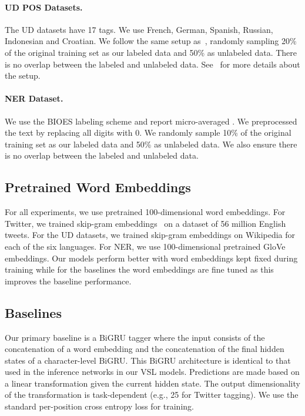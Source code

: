 \documentclass[11pt,a4paper]{article}
\newcommand{\klcomment}[1]{\textcolor{magenta}{\bf \small [ #1 --KL]}}
\renewcommand{\klcomment}[1]{}
\begin{document}
\paragraph{UD POS Datasets.} The UD datasets have 17 tags. We use French, German, Spanish, Russian, Indonesian and Croatian. We follow the same setup as~\citet{zhang2017semi}, randomly sampling 20\% of the original training set as our labeled data and 50\% as unlabeled data. There is no overlap between the labeled and unlabeled data. See~\citet{zhang2017semi} for more details about the setup.
\paragraph{NER Dataset.} We use the BIOES labeling scheme and report micro-averaged .
We preprocessed the text by replacing all digits with 0. We randomly sample 10\% of the original training set as our labeled data and 50\% as unlabeled data. We also ensure there is no overlap between the labeled and unlabeled data.

\subsection{Pretrained Word Embeddings}
For all experiments, we use pretrained 100-dimensional word embeddings. For Twitter, we trained skip-gram embeddings~\cite{mikolov2013efficient} on a dataset of 56 million English tweets.
For the UD datasets, we trained skip-gram embeddings on Wikipedia for each of the six languages. For NER, we use 100-dimensional pretrained GloVe~\cite{pennington2014glove} embeddings. Our models perform better with word embeddings kept fixed during training while for the baselines the word embeddings are fine tuned as this improves the baseline performance.\klcomment{added "as this..."}

\subsection{Baselines}
\label{baseline}
Our primary baseline is a BiGRU tagger where the input consists of the concatenation of a word embedding and the concatenation of the final hidden states of a character-level BiGRU. This BiGRU architecture is identical to that used in the inference networks in our VSL models.
Predictions are made based on a linear transformation given the current hidden state. The output dimensionality of the transformation is task-dependent (e.g., 25 for Twitter tagging). We use the standard per-position cross entropy loss for training.
\end{document}
